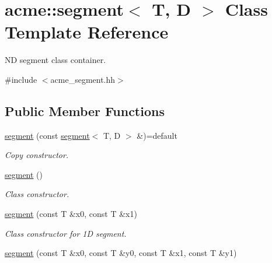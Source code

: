 \hypertarget{classacme_1_1segment}{}\section{acme\+:\+:segment$<$ T, D $>$ Class Template Reference}
\label{classacme_1_1segment}


ND segment class container.  




{\ttfamily \#include $<$acme\+\_\+segment.\+hh$>$}

\subsection*{Public Member Functions}
\begin{DoxyCompactItemize}
\item 
\mbox{\label{classacme_1_1segment_a013f653c2e6b3f34d6f491fa709c937f}} 
\hyperlink{classacme_1_1segment_a013f653c2e6b3f34d6f491fa709c937f}{segment} (const \hyperlink{classacme_1_1segment}{segment}$<$ T, D $>$ \&)=default
\begin{DoxyCompactList}\small\item\em Copy constructor. \end{DoxyCompactList}\item 
\mbox{\label{classacme_1_1segment_a2a5078f0e075411f2b583a7328f25a21}} 
\hyperlink{classacme_1_1segment_a2a5078f0e075411f2b583a7328f25a21}{segment} ()
\begin{DoxyCompactList}\small\item\em Class constructor. \end{DoxyCompactList}\item 
\mbox{\label{classacme_1_1segment_a1f132ded45c054f163dec356f4a515f7}} 
\hyperlink{classacme_1_1segment_a1f132ded45c054f163dec356f4a515f7}{segment} (const T \&x0, const T \&x1)
\begin{DoxyCompactList}\small\item\em Class constructor for 1D segment. \end{DoxyCompactList}\item 
\mbox{\label{classacme_1_1segment_a9de599915f9d139ef55eb37052a6cd40}} 
\hyperlink{classacme_1_1segment_a9de599915f9d139ef55eb37052a6cd40}{segment} (const T \&x0, const T \&y0, const T \&x1, const T \&y1)

\end{DoxyCompactItemize}
